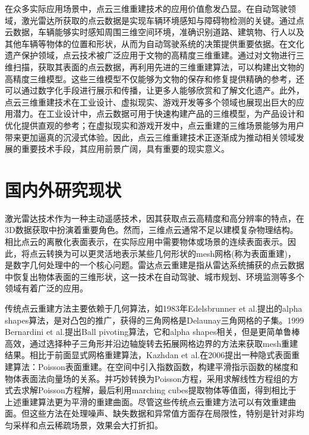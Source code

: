 \documentclass{xduugthesis}
\begin{document}
在众多实际应用场景中，点云三维重建技术的应用价值愈发凸显。在自动驾驶领域，激光雷达所获取的点云数据是实现车辆环境感知与障碍物检测的关键。通过点云数据，车辆能够实时感知周围三维空间环境，准确识别道路、建筑物、行人以及其他车辆等物体的位置和形状，从而为自动驾驶系统的决策提供重要依据。在文化遗产保护领域，点云技术被广泛应用于文物的高精度三维重建。通过对文物进行三维扫描，获取其表面的点云数据，再利用先进的三维重建算法，可以构建出文物的高精度三维模型。这些三维模型不仅能够为文物的保存和修复提供精确的参考，还可以通过数字化手段进行展示和传播，让更多人能够欣赏和了解文化遗产。此外，点云三维重建技术在工业设计、虚拟现实、游戏开发等多个领域也展现出巨大的应用潜力。在工业设计中，点云数据可用于快速构建产品的三维模型，为产品设计和优化提供直观的参考；在虚拟现实和游戏开发中，点云重建的三维场景能够为用户带来更加逼真的沉浸式体验。因此，点云三维重建技术正逐渐成为推动相关领域发展的重要技术手段，其应用前景广阔，具有重要的现实意义。
\section{国内外研究现状}
激光雷达技术作为一种主动遥感技术，因其获取点云高精度和高分辨率的特点，在3D数据获取中扮演着重要角色。然而，三维点云通常不足以建模复杂物理结构。相比点云的离散化表面表示，在实际应用中需要物体或场景的连续表面表示。因此，将点云转换为可以更灵活地表示某些几何形状的mesh网格(称为表面重建)，是数字几何处理中的一个核心问题。雷达点云重建是指从雷达系统捕获的点云数据中恢复出物体表面的三维形状，这一技术在自动驾驶、城市规划、环境监测等多个领域有着广泛的应用。

传统点云重建方法主要依赖于几何算法，如1983年Edelsbrunner et al.提出的alpha shapes算法，是对凸包的推广，获得的三角网格是Delaunay三角网格的子集。1999 Bernardini et al.提出Ball pivoting算法，它和alpha shapes相关，但是更简单鲁棒高效，通过选择种子三角形并沿边轴旋转去拓展网格边界的方法来获取mesh重建结果。相比于前面显式网格重建算法，Kazhdan et al.在2006提出一种隐式表面重建算法：Poisson表面重建。在空间中引入指数函数，构建平滑指示函数的梯度和物体表面法向量场的关系。并巧妙转换为Poisson方程，采用求解线性方程组的方式去求解Poisson方程解，最后利用marching cubes提取物体等值面，得到相比于上述重建算法更为平滑的重建曲面。尽管这些传统点云重建方法可以有效重建曲面。但这些方法在处理噪声、缺失数据和异常值方面存在局限性，特别是针对非均匀采样和点云稀疏场景，效果会大打折扣。 
\end{document}
